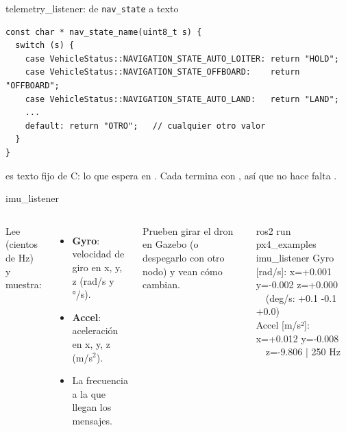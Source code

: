 \begin{frame}[fragile]{telemetry\_listener: de \texttt{nav\_state} a texto}
  \begin{lstlisting}[style=cpp,caption={Una función que traduce el número a un nombre}]
const char * nav_state_name(uint8_t s) {
  switch (s) {
    case VehicleStatus::NAVIGATION_STATE_AUTO_LOITER: return "HOLD";
    case VehicleStatus::NAVIGATION_STATE_OFFBOARD:    return "OFFBOARD";
    case VehicleStatus::NAVIGATION_STATE_AUTO_LAND:   return "LAND";
    ...
    default: return "OTRO";   // cualquier otro valor
  }
}
  \end{lstlisting}
  \small {} es texto fijo de C: lo que espera  en . Cada 
  termina con , así que no hace falta .
\end{frame}

\begin{frame}{imu\_listener}
  \begin{columns}[c]
    \small
    Lee  (cientos de Hz) y muestra:
    \begin{itemize}
      \item \textbf{Gyro}: velocidad de giro en x, y, z (rad/s y °/s).
      \item \textbf{Accel}: aceleración en x, y, z (m/s$^2$).
      \item La frecuencia a la que llegan los mensajes.
    \end{itemize}
    Prueben girar el dron en Gazebo (o despegarlo con otro nodo) y vean cómo cambian.
    \begin{terminal}{ros2 run px4\_examples imu\_listener}
Gyro [rad/s]: x=+0.001 y=-0.002 z=+0.000\\
\ \ (deg/s: +0.1 -0.1 +0.0)\\
Accel [m/s²]: x=+0.012 y=-0.008\\
\ \ z=-9.806 | 250 Hz
    \end{terminal}
  \end{columns}
\end{frame}

